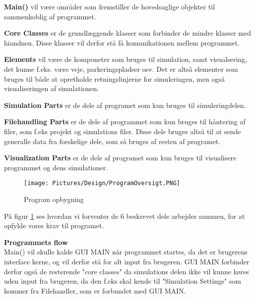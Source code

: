 \textbf{Main()} vil være områder som fremstiller de hovedsaglige objekter til sammenkoblig af programmet.

\vspace{5mm}

\textbf{Core Classes} er de grundlæggende klasser som forbinder de mindre klasser med hiandnen. Disse klasser vil derfor stå få komunikationen mellem programmet.

\vspace{5mm}

\textbf{Elements} vil være de komponeter som bruges til simulation, samt visualsering, det kunne f.eks. være veje, parkeringspladser osv. Det er altså elementer som bruges til både at opretholde retningslinjerne for simuleringen, men også visualiseringen af simulationen.

\vspace{5mm}

\textbf{Simulation Parts} er de dele af programet som kun bruges til simuleringdelen.

\vspace{5mm}

\textbf{Filehandling Parts} er de dele af programmet som kun bruges til håntering af filer, som f.eks projekt og simulations filer. Disse dele bruges altså til at sende generalle data fra forskelige dele, som så bruges af resten af programet.  

\vspace{5mm}

\textbf{Visualization Parts} er de dele af programet som kun bruges til visualisere programmet og dens simulationer.

\begin{figure}[H]
\begin{adjustbox}{width=1.0\textwidth,center=\textwidth}
\centering
\texttt{[image: Pictures/Design/ProgramOversigt.PNG]}
\end{adjustbox}
\caption{Program opbygning}
\label{fig:ProgramOversigt}
\end{figure}

\vspace{5mm}

På figur \ref{fig:ProgramOversigt} ses hvordan vi forventer de 6 beskrevet dele arbejder sammen, for at opfylde vores krav til programet.

\vspace{5mm}

\textbf{Programmets flow} \\
Main() vil skulle kalde GUI MAIN når programmet startes, da det er brugerens interface kerne, og vil derfor stå for alt input fra brugeren. GUI MAIN forbinder derfor også de resterende "core classes" da simulations delen ikke vil kunne køres uden input fra brugeren, da den f.eks skal kende til "Simulation Settings" som kommer fra Filehandler, som er forbundet med GUI MAIN. \\

